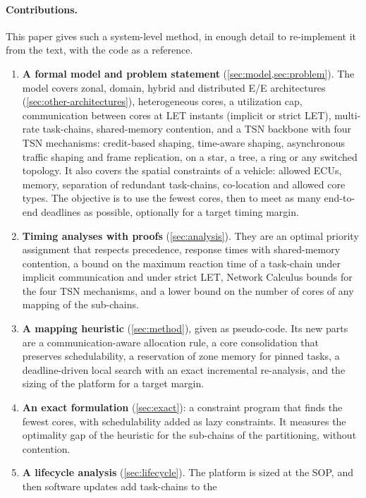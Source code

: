 \paragraph{Contributions.} This paper gives such a system-level method,
in enough detail to re-implement it from the text, with the code as a
reference.
\begin{enumerate}[label=\textbf{C\arabic*.}, leftmargin=2.2em]
\item \textbf{A formal model and problem statement}
(\cref{sec:model,sec:problem}). The model covers zonal, domain, hybrid
and distributed E/E architectures (\cref{sec:other-architectures}),
heterogeneous cores,
a utilization cap, communication between cores at LET instants (implicit
or strict LET), multi-rate task-chains,
shared-memory contention, and a TSN backbone with
four TSN mechanisms: credit-based shaping, time-aware shaping,
asynchronous traffic shaping and frame replication, on a star, a tree, a
ring or any switched topology. It also covers the
spatial constraints of a vehicle: allowed ECUs, memory, separation of
redundant task-chains, co-location and allowed core types. The objective
is to use the fewest cores, then to meet as many end-to-end deadlines as
possible, optionally for a target timing margin.
\item \textbf{Timing analyses with proofs} (\cref{sec:analysis}). They are
an optimal priority assignment that respects precedence, response times
with shared-memory contention, a bound on the maximum reaction time of a
task-chain under implicit communication and under strict LET, Network
Calculus bounds for the four TSN mechanisms,
and a lower bound on the number of cores of any mapping of the
sub-chains.
\item \textbf{A mapping heuristic} (\cref{sec:method}), given as
pseudo-code. Its new parts are a communication-aware allocation rule, a
core consolidation that preserves schedulability, a reservation of zone
memory for pinned tasks, a deadline-driven local search with an exact
incremental re-analysis, and the sizing of the platform for a target
margin.
\item \textbf{An exact formulation} (\cref{sec:exact}): a constraint
program that finds the fewest cores, with schedulability added as lazy
constraints. It measures the optimality gap of the heuristic for the
sub-chains of the partitioning, without contention.
\item \textbf{A lifecycle analysis} (\cref{sec:lifecycle}). The platform
is sized at the SOP, and then software updates add task-chains to the

\end{enumerate}
